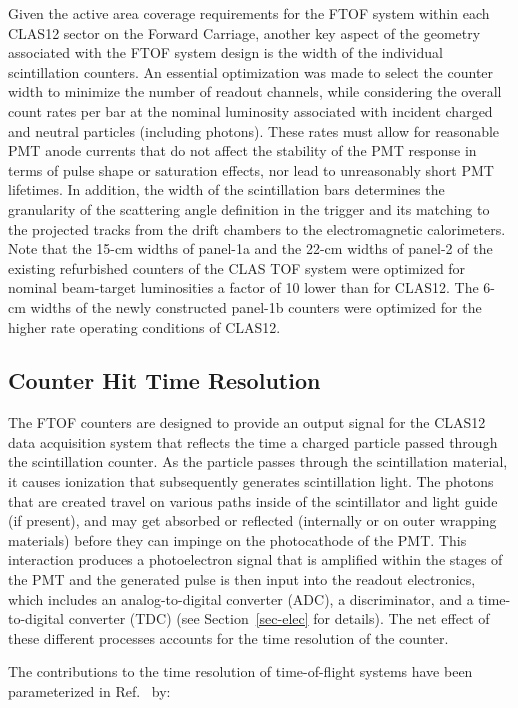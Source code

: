 \documentclass[3p,times,twocolumn]{elsarticle}
\begin{document}
Given the active area coverage requirements for the FTOF system within each CLAS12 sector on the
Forward Carriage, another key aspect of the geometry associated with the FTOF system design is
the width of the individual scintillation counters. An essential optimization was made to select the
counter width to minimize the number of readout channels, while considering the overall count rates per
bar at the nominal luminosity associated with incident charged and neutral particles (including photons).
These rates must allow for reasonable PMT anode currents that do not affect the stability of the PMT
response in terms of pulse shape or saturation effects, nor lead to unreasonably short PMT lifetimes.
In addition, the width of the scintillation bars determines the granularity of the scattering angle definition
in the trigger and its matching to the projected tracks from the drift chambers to the electromagnetic
calorimeters. Note that the 15-cm widths of panel-1a and the 22-cm widths of panel-2 of the existing
refurbished counters of the CLAS TOF system were optimized for nominal beam-target luminosities a
factor of 10 lower than for CLAS12. The 6-cm widths of the newly constructed panel-1b counters were
optimized for the higher rate operating conditions of CLAS12.

\subsection{Counter Hit Time Resolution}
\label{res-sec}

The FTOF counters are designed to provide an output signal for the CLAS12 data acquisition system
\cite{daq-nim} that reflects the time a charged particle passed through the scintillation counter. As the
particle passes through the scintillation material, it causes ionization that subsequently generates
scintillation light. The photons that are created travel on various paths inside of the scintillator and light
guide (if present), and may get absorbed or reflected (internally or on outer wrapping materials) before
they can impinge on the photocathode of the PMT. This interaction produces a photoelectron signal that is
amplified within the stages of the PMT and the generated pulse is then input into the readout electronics,
which includes an analog-to-digital converter (ADC), a discriminator, and a time-to-digital converter (TDC)
(see Section~\ref{sec-elec} for details). The net effect of these different processes accounts for the time
resolution of the counter.

The contributions to the time resolution of time-of-flight systems have been parameterized in
Ref.~\cite{kuhlen} by:
\end{document}
